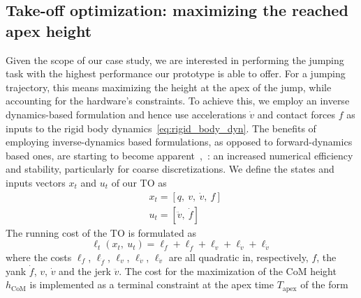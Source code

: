 \subsection{Take-off optimization: maximizing the reached apex height}\label{subsec:takeoff_opt}
Given the scope of our case study, we are interested in performing the jumping task with the highest performance our prototype is able to offer. For a jumping trajectory, this means maximizing the height at the apex of the jump, while accounting for the hardware's constraints. To achieve this, we employ an inverse dynamics-based formulation and hence use accelerations $\dot{v}$ and contact forces $f$ as inputs to the rigid body dynamics~\eqref{eq:rigid_body_dyn}. The benefits of employing inverse-dynamics based formulations, as opposed to forward-dynamics based ones, are starting to become apparent~\cite{to::ferrolho2021inverse},~\cite{to::mastalli2022inverse}: an increased numerical efficiency and stability, particularly for coarse discretizations. We define the states and inputs vectors $x_t$ and $u_t$ of  our TO as
\begin{eqnarray}
&x_t = \left[q,~v,~\dot{v},~f\right]\label{eq:states_takeoff_opt}\\
&u_t = \left[\ddot{v},~\dot{f}\right]\label{eq:inputs_takeoff_opt}
\end{eqnarray}
The running cost of the TO is formulated as
\begin{dmath}\label{eq:takeoff_running_cost}
    \ell_{t}(x_t,~u_t) = \ell_f + \ell_{\dot{f}} + \ell_{v} +  \ell_{\dot{v}} + \ell_{\ddot{v}}
\end{dmath}
where the costs $\ell_{f}$, $\ell_{\dot{f}}$, $\ell_{v}$, $\ell_{\dot{v}}$, $\ell_{\ddot{v}}$ are all quadratic in, respectively, $f$, the yank $\dot{f}$, $v$, $\dot{v}$ and the jerk $\ddot{v}$. 
The cost for the maximization of the CoM height $h_{\mathrm{CoM}}$ is implemented as a terminal constraint at the apex time $T_{\mathrm{apex}}$ of the form 
